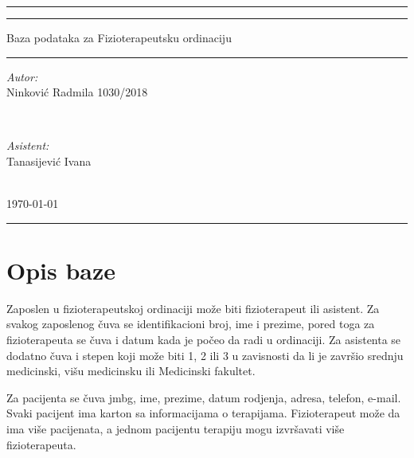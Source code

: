 \documentclass{article}
\begin{document}
	
\begin{titlepage} 
	\centering 
	
	\rule{\textwidth}{1pt}
	
	\vspace{2pt}\vspace{-\baselineskip} 
	
	\rule{\textwidth}{0.4pt}
	
	\vspace{0.025\textheight}

	{\Huge Baza podataka za Fizioterapeutsku ordinaciju}
	
	\vspace{0.020\textheight}
	
	\rule{0.5\textwidth}{1pt}
	
	\vspace{0.5\textheight}
	
	\begin{minipage}{0.4\textwidth}
		\begin{flushleft} \large
			\emph{Autor:}\\
			Ninković Radmila 1030/2018
		\end{flushleft}
	\end{minipage}
	~
	\begin{minipage}{0.4\textwidth}
		\begin{flushright} \large
			\emph{Asistent:} \\
			Tanasijević Ivana
		\end{flushright}
	\end{minipage}\\[2cm]

	{\large \today}\\[2cm]
	
	\rule{1\textwidth}{1.5pt}
	
\end{titlepage}

\newpage
\section{Opis baze}

Zaposlen u fizioterapeutskoj ordinaciji može biti fizioterapeut ili asistent. Za svakog zaposlenog čuva se identifikacioni broj, ime i prezime, pored toga za fizioterapeuta se čuva i datum kada je počeo da radi u ordinaciji. Za asistenta se dodatno čuva i stepen koji može biti 1, 2 ili 3 u zavisnosti da li je završio srednju medicinski, višu medicinsku ili Medicinski fakultet.

Za pacijenta se čuva jmbg, ime, prezime, datum rodjenja, adresa, telefon, e-mail. Svaki pacijent ima karton sa informacijama o terapijama. Fizioterapeut može da ima više pacijenata, a jednom pacijentu terapiju mogu izvršavati više fizioterapeuta.
\end{document}
